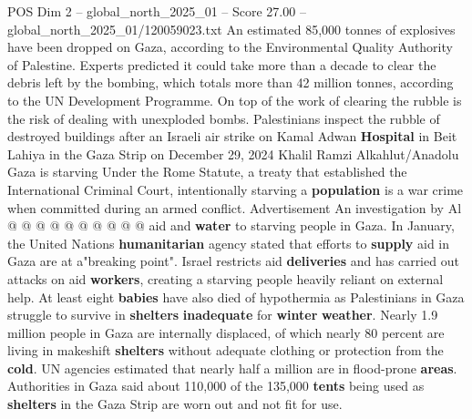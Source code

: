 \begin{textsample}{POS Dim 2 – global\_north\_2025\_01 – Score 27.00 – global\_north\_2025\_01/120059023.txt}
An estimated 85,000 tonnes of explosives have been dropped on Gaza, according to the Environmental Quality Authority of Palestine.
Experts predicted it could take more than a decade to clear the debris left by the bombing, which totals more than 42 million tonnes, according to the UN Development Programme.
On top of the work of clearing the rubble is the risk of dealing with unexploded bombs.
Palestinians inspect the rubble of destroyed buildings after an Israeli air strike on Kamal Adwan \textbf{Hospital} in Beit Lahiya in the Gaza Strip on December 29, 2024 Khalil Ramzi Alkahlut/Anadolu Gaza is starving Under the Rome Statute, a treaty that established the International Criminal Court, intentionally starving a \textbf{population} is a war crime when committed during an armed conflict.
Advertisement An investigation by Al @ @ @ @ @ @ @ @ @ @ aid and \textbf{water} to starving people in Gaza.
In January, the United Nations \textbf{humanitarian} agency stated that efforts to \textbf{supply} aid in Gaza are at a"breaking point".
Israel restricts aid \textbf{deliveries} and has carried out attacks on aid \textbf{workers}, creating a starving people heavily reliant on external help.
At least eight \textbf{babies} have also died of hypothermia as Palestinians in Gaza struggle to survive in \textbf{shelters} \textbf{inadequate} for \textbf{winter} \textbf{weather}.
Nearly 1.9 million people in Gaza are internally displaced, of which nearly 80 percent are living in makeshift \textbf{shelters} without adequate clothing or protection from the \textbf{cold}.
UN agencies estimated that nearly half a million are in flood-prone \textbf{areas}.
Authorities in Gaza said about 110,000 of the 135,000 \textbf{tents} being used as \textbf{shelters} in the Gaza Strip are worn out and not fit for use.

\end{textsample}
